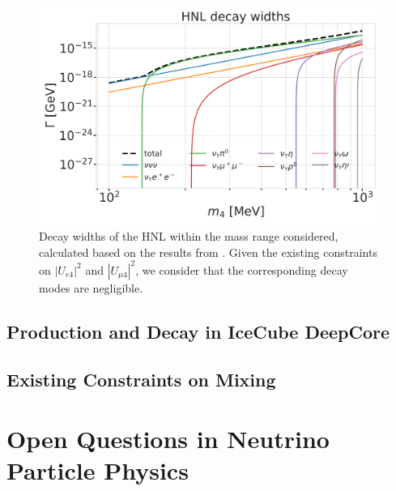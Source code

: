 
\begin{figure}
    \includegraphics{figures/hnl_simulation/decay_theory/hnl_decay_widths_up_to_1.0_GeV_log.png}
    \caption{Decay widths of the HNL within the mass range considered, calculated based on the results from \cite{Coloma:2020lgy}. Given the existing constraints on $|U_{e4}|^{2}$ and $|U_{\mu4}|^{2}$, we consider that the corresponding decay modes are negligible.}
\end{figure}


\subsection{Production and Decay in IceCube DeepCore} 


\subsection{Existing Constraints on Mixing} 


\section{Open Questions in Neutrino Particle Physics}
